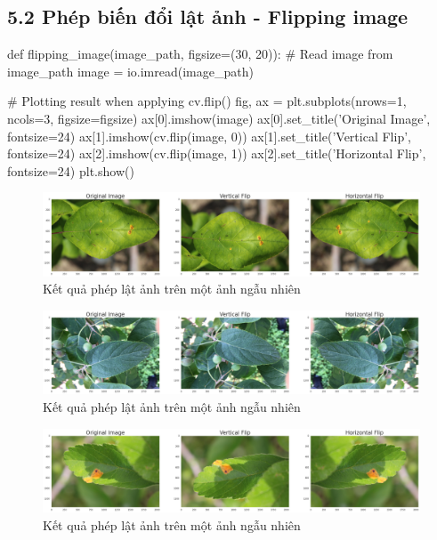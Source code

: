 \documentclass{article}
\begin{document}
	\subsection{5.2 Phép biến đổi lật ảnh - Flipping image}
	\begin{python}
		def flipping_image(image_path, figsize=(30, 20)):
			# Read image from image_path
			image = io.imread(image_path)
			
			# Plotting result when applying cv.flip()
			fig, ax = plt.subplots(nrows=1, ncols=3, figsize=figsize)
			ax[0].imshow(image)
			ax[0].set_title('Original Image', fontsize=24)
			ax[1].imshow(cv.flip(image, 0))
			ax[1].set_title('Vertical Flip', fontsize=24)
			ax[2].imshow(cv.flip(image, 1))
			ax[2].set_title('Horizontal Flip', fontsize=24)
			plt.show()
	\end{python}
	\begin{figure}[H]
		\centering
		\includegraphics[width=1\linewidth]{images/flipping_image.png}
		\caption{Kết quả phép lật ảnh trên một ảnh ngẫu nhiên}
		\label{fig:writing-thesis}
	\end{figure}
	\begin{figure}[H]
		\centering
		\includegraphics[width=1\linewidth]{images/flipping_image_1.png}
		\caption{Kết quả phép lật ảnh trên một ảnh ngẫu nhiên}
		\label{fig:writing-thesis}
	\end{figure}
	\begin{figure}[H]
		\centering
		\includegraphics[width=1\linewidth]{images/flipping_image_2.png}
		\caption{Kết quả phép lật ảnh trên một ảnh ngẫu nhiên}
		\label{fig:writing-thesis}
	\end{figure}
\end{document}
